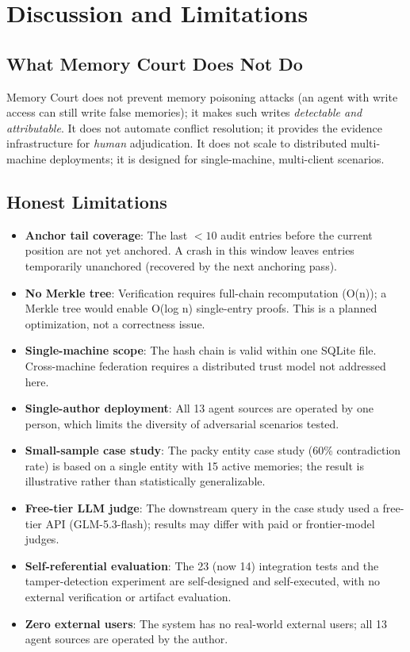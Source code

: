 \documentclass{article}
\begin{document}
\section{Discussion and Limitations}

\subsection{What Memory Court Does Not Do}

Memory Court does not prevent memory poisoning attacks (an agent with write access can still write false memories); it makes such writes \emph{detectable and attributable}. It does not automate conflict resolution; it provides the evidence infrastructure for \emph{human} adjudication. It does not scale to distributed multi-machine deployments; it is designed for single-machine, multi-client scenarios.

\subsection{Honest Limitations}

\begin{itemize}
\item \textbf{Anchor tail coverage}: The last $<10$ audit entries before the current position are not yet anchored. A crash in this window leaves entries temporarily unanchored (recovered by the next anchoring pass).
\item \textbf{No Merkle tree}: Verification requires full-chain recomputation (O(n)); a Merkle tree would enable O(log n) single-entry proofs. This is a planned optimization, not a correctness issue.
\item \textbf{Single-machine scope}: The hash chain is valid within one SQLite file. Cross-machine federation requires a distributed trust model not addressed here.
\item \textbf{Single-author deployment}: All 13 agent sources are operated by one person, which limits the diversity of adversarial scenarios tested.
\item \textbf{Small-sample case study}: The packy entity case study (60\% contradiction rate) is based on a single entity with 15 active memories; the result is illustrative rather than statistically generalizable.
\item \textbf{Free-tier LLM judge}: The downstream query in the case study used a free-tier API (GLM-5.3-flash); results may differ with paid or frontier-model judges.
\item \textbf{Self-referential evaluation}: The 23 (now 14) integration tests and the tamper-detection experiment are self-designed and self-executed, with no external verification or artifact evaluation.
\item \textbf{Zero external users}: The system has no real-world external users; all 13 agent sources are operated by the author.
\end{itemize}
\end{document}
